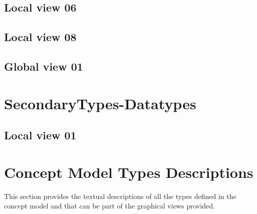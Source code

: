 \subsection{Local view 06}
\label{sec:lu.uni.lassy.excalibur.examples.icrash-CM-view-local-PrimaryTypes-Datatypes-06}

\subsection{Local view 08}
\label{sec:lu.uni.lassy.excalibur.examples.icrash-CM-view-local-PrimaryTypes-Datatypes-08}


\subsection{Global view 01}
\label{sec:lu.uni.lassy.excalibur.examples.icrash-CM-view-global-PrimaryTypes-Datatypes-01}





\section{SecondaryTypes-Datatypes}
\subsection{Local view 01}
\label{sec:lu.uni.lassy.excalibur.examples.icrash-CM-view-local-SecondaryTypes-Datatypes-01}






\section{Concept Model Types Descriptions}
This section provides the textual descriptions of all the types defined in the concept model and that can be part of the graphical views provided.












